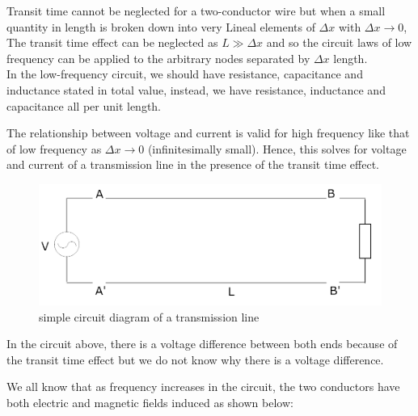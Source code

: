 Transit time cannot be neglected for a two-conductor wire but when a small quantity in length is broken down into very Lineal elements of $ \Delta x $ with  $  \Delta x \rightarrow 0 $, The transit time effect can be neglected as $ L \gg \Delta x $ and so the circuit laws of low frequency can be applied to the arbitrary nodes separated by $ \Delta x $ length. \\
In the low-frequency circuit, we should have resistance, capacitance and inductance stated in total value, instead, we have resistance, inductance and capacitance all per unit length.

The relationship between voltage and current is valid for high frequency like that of low frequency as $ \Delta x  \rightarrow 0$ (infinitesimally small). Hence, this solves for voltage and current of a transmission line in the presence of the transit time effect.\\
\begin{figure}[h]
\centering
\includegraphics[width=1\linewidth]{./graphics/second}
\caption{simple circuit diagram of a transmission line}
\end{figure}	

In the circuit above, there is a voltage difference between both ends because of the transit time effect but we do not know why there is a voltage difference.

We all know that as frequency increases in the circuit, the two conductors have both electric and magnetic fields induced as shown below: 

